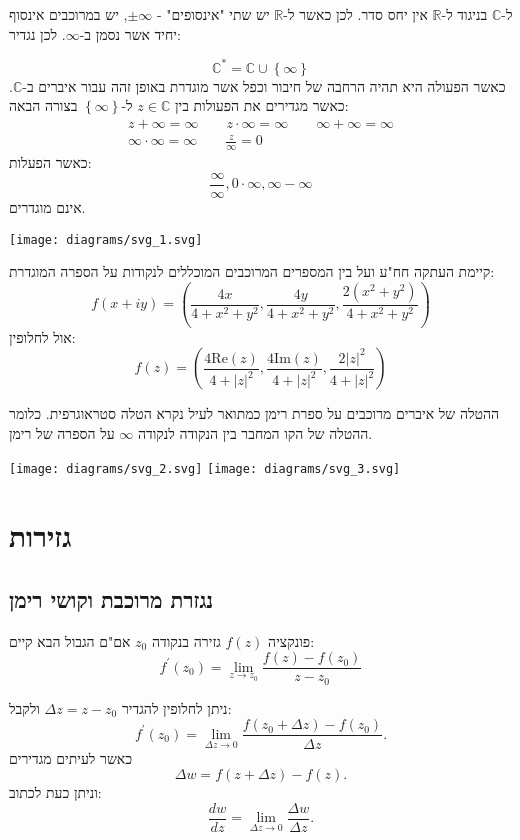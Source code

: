 \documentclass{tstextbook}
\begin{document}
ל-\(\mathbb{C}\) בניגוד ל-\(\mathbb{R}\) אין יחס סדר. לכן כאשר ל-\(\mathbb{R}\) יש שתי "אינסופים" - \(\pm\infty\), יש במרוכבים אינסוף יחיד אשר נסמן ב-\(\infty\). לכן נגדיר:

\begin{definition}
$$\mathbb{C}^*=\mathbb{C}\cup \left\{  \infty  \right\}$$
כאשר הפעולה היא תהיה הרחבה של חיבור וכפל אשר מוגדרת באופן זהה עבור איברים ב-\(\mathbb{C}\). כאשר מגדירים את הפעולות בין \(z\in \mathbb{C}\) ל-\(\left\{  \infty   \right\}\) בצורה הבאה:
$$\begin{gather}z+\infty=\infty \qquad z\cdot \infty=\infty \qquad \infty+\infty=\infty \\\infty\cdot \infty=\infty \qquad \frac{z}{\infty}=0 
\end{gather}$$
כאשר הפעלות:
$$\frac{\infty}{\infty},0\cdot \infty,\infty-\infty$$
אינם מוגדרים.

\end{definition}
\texttt{[image: diagrams/svg\_1.svg]}
\begin{proposition}
קיימת העתקה חח"ע ועל בין המספרים המרוכבים המוכללים לנקודות על הספרה המוגדרת:
$$f(x+iy)=\left( \frac{4x}{4+x^2+y^2},\frac{4y}{4+x^2+y^2},\frac{2(x^2+y^2)}{4+x^2+y^2} \right)$$
אול לחלופין:
$$f(z)=\left( \frac{4\mathrm{Re}(z)}{4+\lvert z \rvert ^2},\frac{4\mathrm{Im}(z)}{4+\lvert z \rvert ^2},\frac{2\lvert z \rvert ^2}{4+\lvert z \rvert ^2} \right)$$

\end{proposition}
\begin{definition}
ההטלה של איברים מרוכבים על ספרת רימן כמתואר לעיל נקרא הטלה סטראוגרפית. כלומר ההטלה של הקו המחבר בין הנקודה לנקודה \(\infty\) על הספרה של רימן.

\end{definition}
\texttt{[image: diagrams/svg\_2.svg]}
\texttt{[image: diagrams/svg\_3.svg]}
\section{גזירות}

\subsection{נגזרת מרוכבת וקושי רימן}

\begin{definition}
פונקציה \(f(z)\) גזירה בנקודה \(z_{0}\) אם"ם הגבול הבא קיים:
$$f^{\prime}(z_{0})=\operatorname*{lim}_{z\to z_{0}}{\frac{f(z)-f(z_{0})}{z-z_{0}}}$$

\end{definition}
ניתן לחלופין להגדיר \(\Delta z=z-z_{0}\) ולקבל:
$$f^{\prime}(z_{0})=\operatorname*{lim}_{\Delta z\to0}{\frac{f(z_{0}+\Delta z)-f(z_{0})}{\Delta z}}.$$
כאשר לעיתים מגדירים
$$\Delta w=f(z+\Delta z)-f(z).$$
וניתן כעת לכתוב:
$$\frac{d w}{d z}=\operatorname*{lim}_{\Delta z\to0}\frac{\Delta w}{\Delta z}.$$
\end{document}
